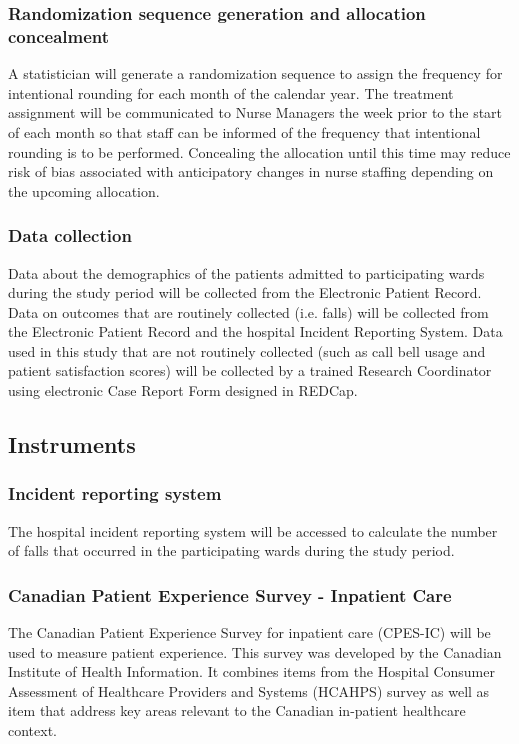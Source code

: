 \documentclass[12pt]{article}
\begin{document}
\subsubsection{Randomization sequence generation and allocation concealment}
A statistician will generate a randomization sequence to assign the frequency for intentional rounding for each month of the calendar year. The treatment assignment will be communicated to Nurse Managers the week prior to the start of each month so that staff can be informed of the frequency that intentional rounding is to be performed. Concealing the allocation until this time may reduce risk of bias associated with anticipatory changes in nurse staffing depending on the upcoming allocation. 

\subsubsection{Data collection}
Data about the demographics of the patients admitted to participating wards during the study period will be collected from the Electronic Patient Record. Data on outcomes that are routinely collected (i.e. falls) will be collected from the Electronic Patient Record and the hospital Incident Reporting System. Data used in this study that are not routinely collected (such as call bell usage and patient satisfaction scores) will be collected by a trained Research Coordinator using electronic Case Report Form designed in REDCap.

\subsection{Instruments}

\subsubsection{Incident reporting system}
The hospital incident reporting system will be accessed to calculate the number of falls that occurred in the participating wards during the study period. 


\subsubsection{Canadian Patient Experience Survey - Inpatient Care}
The Canadian Patient Experience Survey for inpatient care (CPES-IC) will be used to measure patient experience. This survey was developed by the Canadian Institute of Health Information. It combines items from the Hospital Consumer Assessment of Healthcare Providers and Systems (HCAHPS) survey as well as item that address key areas relevant to the Canadian in-patient healthcare context. 
\end{document}
